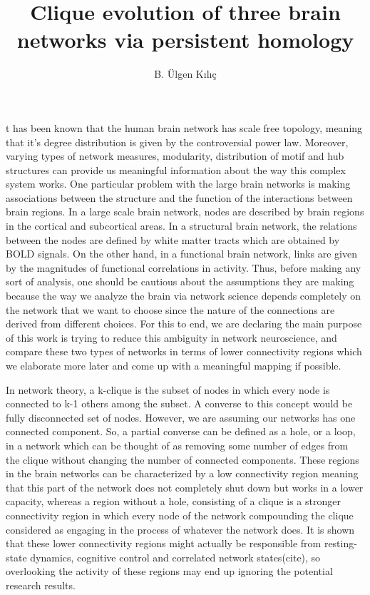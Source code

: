 \documentclass[9pt,twocolumn,twoside,lineno]{pnas-new}
\title{Clique evolution of three brain networks via persistent homology}
\author[a,1]{B. Ülgen Kılıç}
\affil[a]{University at Buffalo, Department of Mathematics}
\begin{document}
\maketitle
\thispagestyle{firststyle}

t has been known that the human brain network has scale free topology, meaning that it's degree distribution is given by the controversial power law. Moreover, varying types of network measures, modularity, distribution of motif and hub structures can provide us meaningful information about the way this complex system works. One particular problem with the large brain networks is making associations between the structure and the function of the interactions between brain regions. In a large scale brain network, nodes are described by brain regions in the cortical and subcortical areas. In a structural brain network, the relations between the nodes are defined by white matter tracts which are obtained by BOLD signals. On the other hand, in a functional brain network, links are given by the magnitudes of functional correlations in activity. Thus, before making any sort of analysis, one should be cautious about the assumptions they are making because the way we analyze the brain via network science depends completely on the network that we want to choose since the nature of the connections are derived from different choices. For this to end, we are declaring the main purpose of this work is trying to reduce this ambiguity in network neuroscience, and compare these two types of networks in terms of lower connectivity regions which we elaborate more later and come up with a meaningful mapping if possible.

  In network theory, a k-clique is the subset of nodes in which every node is connected to k-1 others among the subset. A converse to this concept would be fully disconnected set of nodes. However, we are assuming our networks has one connected component. So, a partial converse can be defined as a hole, or a loop, in a network which can be thought of as removing some number of edges from the clique without changing the number of connected components. These regions in the brain networks can be characterized by a low connectivity region meaning that this part of the network does not completely shut down but works in a lower capacity, whereas a region without a hole, consisting of a clique is a stronger connectivity region in which every node of the network compounding the clique considered as engaging in the process of whatever the network does. It is shown that these lower connectivity regions might actually be responsible from resting-state dynamics, cognitive control and correlated network states(cite), so overlooking the activity of these regions may end up ignoring the potential research results.
  
\end{document}
